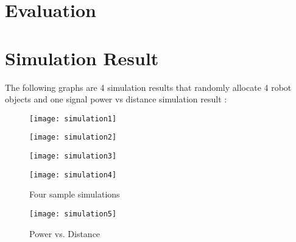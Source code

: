 \section{Evaluation}
\label{sec:evaluation}
\section{Simulation Result}
\indent The following graphs are 4 simulation results that randomly allocate 4 robot objects and one signal power vs distance simulation result :\\
 
\begin{figure}[h]
\begin{minipage}[h]{0.4\linewidth}
	\centering
	\texttt{[image: simulation1]}
	\end{minipage}
	
	\begin{minipage}[h]{0.4\linewidth}
	\centering
	\texttt{[image: simulation2]}
	\end{minipage}

	\begin{minipage}[h]{0.4\linewidth}
	\centering
	\texttt{[image: simulation3]}
	\end{minipage}
	
	\begin{minipage}[h]{0.4\linewidth}
	\centering
	\texttt{[image: simulation4]}
	\end{minipage}

\caption{Four sample simulations}

\begin{minipage}[h]{\linewidth}
	\centering
	\texttt{[image: simulation5]}
	\end{minipage}
	\caption{Power vs. Distance}
	
\label{fig:image2}
\end{figure}

